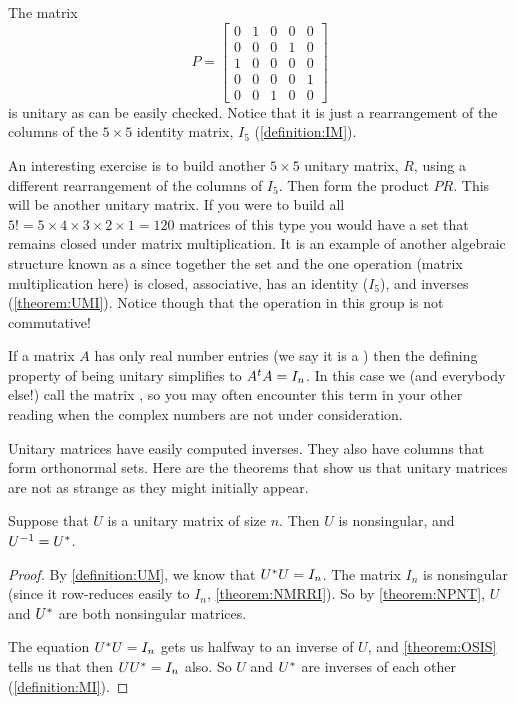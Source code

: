 \documentclass{ximera}
\begin{document}
\begin{example}
  The matrix
  \[
    P=
    \begin{bmatrix}
      0&1&0&0&0\\
      0&0&0&1&0\\
      1&0&0&0&0\\
      0&0&0&0&1\\
      0&0&1&0&0
    \end{bmatrix}
  \]
  is unitary as can be easily checked.  Notice that it is just a rearrangement of the columns of the $5\times 5$ identity matrix, $I_5$ (\ref{definition:IM}).

  An interesting exercise is to build another $5\times 5$ unitary
  matrix, $R$, using a different rearrangement of the columns of
  $I_5$.  Then form the product $PR$.  This will be another unitary
  matrix.  If you were to build all
  $5!=5\times 4\times 3\times 2\times 1=120$ matrices of this type you
  would have a set that remains closed under matrix multiplication.
  It is an example of another algebraic structure known as a
   since together the set and the one operation (matrix
  multiplication here) is closed, associative, has an identity
  ($I_5$), and inverses (\ref{theorem:UMI}).  Notice though that the
  operation in this group is not commutative!
\end{example}

If a matrix $A$ has only real number entries (we say it is a ) then the defining property of being unitary simplifies to
$A^{t}A=I_n$.  In this case we (and everybody else!) call the
matrix , so you may often encounter this term in your
other reading when the complex numbers are not under consideration.

Unitary matrices have easily computed inverses.  They also have
columns that form orthonormal sets.  Here are the theorems that show
us that unitary matrices are not as strange as they might initially
appear.

\begin{theorem}
  \label{theorem:UMI}
  Suppose that $U$ is a unitary matrix of size $n$.  Then $U$ is
  nonsingular, and $U^{-1}=U^\ast$.

  \begin{proof}
    By \ref{definition:UM}, we know that $U^\ast U=I_n$.  The
    matrix $I_n$ is nonsingular (since it row-reduces easily to $I_n$,
    \ref{theorem:NMRRI}).  So by \ref{theorem:NPNT}, $U$ and
    $U^\ast$ are both nonsingular matrices.

    The equation $U^\ast U=I_n$ gets us halfway to an inverse of
    $U$, and \ref{theorem:OSIS} tells us that then $UU^\ast=I_n$
    also.  So $U$ and $U^\ast$ are inverses of each other
    (\ref{definition:MI}).

\end{proof}
\end{theorem}
\end{document}
